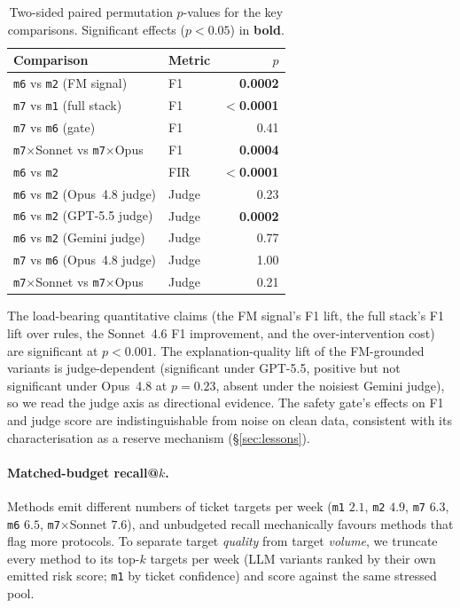\begin{table}[!htbp]
\centering
\footnotesize
\setlength{\tabcolsep}{5pt}
\caption{Two-sided paired permutation $p$-values for the key
comparisons. Significant effects ($p<0.05$) in \textbf{bold}.}
\label{tab:stats_perm}
\begin{tabular}{@{}llr@{}}
\toprule
Comparison & Metric & $p$ \\
\midrule
\texttt{m6} vs \texttt{m2} (FM signal)        & F1   & \textbf{0.0002} \\
\texttt{m7} vs \texttt{m1} (full stack)       & F1   & \textbf{$<$0.0001} \\
\texttt{m7} vs \texttt{m6} (gate)             & F1   & 0.41 \\
\texttt{m7}$\times$Sonnet vs \texttt{m7}$\times$Opus & F1 & \textbf{0.0004} \\
\texttt{m6} vs \texttt{m2}                    & FIR  & \textbf{$<$0.0001} \\
\texttt{m6} vs \texttt{m2} (Opus~4.8 judge)   & Judge & 0.23 \\
\texttt{m6} vs \texttt{m2} (GPT-5.5 judge)    & Judge & \textbf{0.0002} \\
\texttt{m6} vs \texttt{m2} (Gemini judge)     & Judge & 0.77 \\
\texttt{m7} vs \texttt{m6} (Opus~4.8 judge)   & Judge & 1.00 \\
\texttt{m7}$\times$Sonnet vs \texttt{m7}$\times$Opus & Judge & 0.21 \\
\bottomrule
\end{tabular}
\end{table}

The load-bearing quantitative claims (the FM signal's F1 lift, the full
stack's F1 lift over rules, the Sonnet~4.6 F1 improvement, and the
over-intervention cost) are significant at $p\!<\!0.001$. The
explanation-quality lift of the FM-grounded variants is judge-dependent
(significant under GPT-5.5, positive but not significant under Opus~4.8 at
$p\!=\!0.23$, absent under the noisiest Gemini judge), so we read the judge
axis as directional evidence. The safety gate's effects on F1 and judge
score are indistinguishable from noise on clean data, consistent with its
characterisation as a reserve mechanism (\S\ref{sec:lessons}).

\paragraph{Matched-budget recall@$k$.}
\label{app:stats-budget}
Methods emit different numbers of ticket targets per week (\texttt{m1}
$2.1$, \texttt{m2} $4.9$, \texttt{m7} $6.3$, \texttt{m6} $6.5$,
\texttt{m7}$\times$Sonnet $7.6$), and unbudgeted recall mechanically
favours methods that flag more protocols. To separate target \emph{quality}
from target \emph{volume}, we truncate every method to its top-$k$ targets
per week (LLM variants ranked by their own emitted risk score; \texttt{m1}
by ticket confidence) and score against the same stressed pool.

